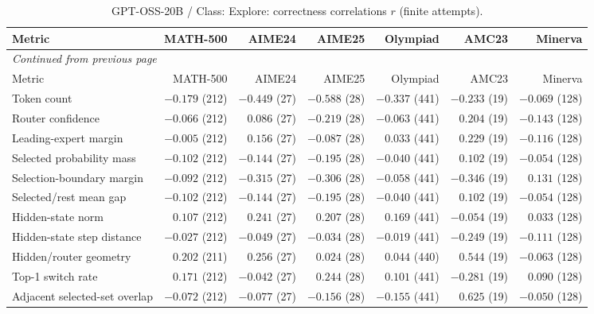 \begingroup\scriptsize\setlength{\tabcolsep}{4pt}
\begin{longtable}{@{}lrrrrrr@{}}
\caption{GPT-OSS-20B / Class: Explore: correctness correlations $r$ (finite attempts).}\label{tab:multi-gptoss-class-Explore}\\
\toprule
Metric & MATH-500 & AIME24 & AIME25 & Olympiad & AMC23 & Minerva \\
\midrule\endfirsthead
\multicolumn{7}{l}{\textit{Continued from previous page}}\\
\toprule
Metric & MATH-500 & AIME24 & AIME25 & Olympiad & AMC23 & Minerva \\
\midrule\endhead
\bottomrule\endfoot
Token count & $-0.179$ (212) & $-0.449$ (27) & $-0.588$ (28) & $-0.337$ (441) & $-0.233$ (19) & $-0.069$ (128) \\
Router confidence & $-0.066$ (212) & $0.086$ (27) & $-0.219$ (28) & $-0.063$ (441) & $0.204$ (19) & $-0.143$ (128) \\
Leading-expert margin & $-0.005$ (212) & $0.156$ (27) & $-0.087$ (28) & $0.033$ (441) & $0.229$ (19) & $-0.116$ (128) \\
Selected probability mass & $-0.102$ (212) & $-0.144$ (27) & $-0.195$ (28) & $-0.040$ (441) & $0.102$ (19) & $-0.054$ (128) \\
Selection-boundary margin & $-0.092$ (212) & $-0.315$ (27) & $-0.306$ (28) & $-0.058$ (441) & $-0.346$ (19) & $0.131$ (128) \\
Selected/rest mean gap & $-0.102$ (212) & $-0.144$ (27) & $-0.195$ (28) & $-0.040$ (441) & $0.102$ (19) & $-0.054$ (128) \\
Hidden-state norm & $0.107$ (212) & $0.241$ (27) & $0.207$ (28) & $0.169$ (441) & $-0.054$ (19) & $0.033$ (128) \\
Hidden-state step distance & $-0.027$ (212) & $-0.049$ (27) & $-0.034$ (28) & $-0.019$ (441) & $-0.249$ (19) & $-0.111$ (128) \\
Hidden/router geometry & $0.202$ (211) & $0.256$ (27) & $0.024$ (28) & $0.044$ (440) & $0.544$ (19) & $-0.063$ (128) \\
Top-1 switch rate & $0.171$ (212) & $-0.042$ (27) & $0.244$ (28) & $0.101$ (441) & $-0.281$ (19) & $0.090$ (128) \\
Adjacent selected-set overlap & $-0.072$ (212) & $-0.077$ (27) & $-0.156$ (28) & $-0.155$ (441) & $0.625$ (19) & $-0.050$ (128) \\
\end{longtable}\endgroup

